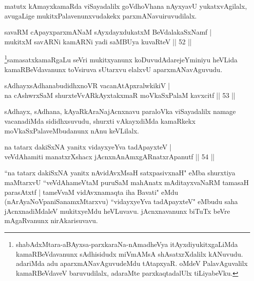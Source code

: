 \begin{artha}
matutx kAmayxkamaRda viSayadalilx goVdhoVhana nAyxyavU yukatxvAgilalx, avugaLige mukitxPalavenunxvudakekx parxmANavu\break iruvudilalx.
\end{artha}


\begin{shl}
savaRM cApayxparxmANaM sAyxdayxdukatxM BeVdalakaSxNamf |\\
mukitxM savARNi kamARNi yadi saMBUya kuvaRteV \hfill || 52 ||
\end{shl}

\begin{artha}
\footnote{shabAdxMtara-aBAyxsa-parxkaraNa-nAmadheVya itAyxdiyukitxgaLiMda kamaRBeVdavanunx sAdhisidudx miVmAMsA shAsatxrXdalilx kANuvudu. adariMda adu aparxmANavAguvudeMdu tAtapxyaR. oMdeV PalavAguvalilx kamaRBeVdaveV baruvudilalx, adaraMte parxkaqtadalUlx tiLiyabeVku.}samasatxkamaRgaLu seVri mukitxyanunx koDuvudAdare\break jeYminiyu heVLida kamaRBeVdavanunx toVsiruva sUtarxvu elalxvU aparxmANavAguvudu.
\end{artha}


\begin{shl}
sAdhayxsAdhanabudidhxnoVR vacanAtApxralwkikiV |\\
na cAshwrxSaM shurxteVvARkAyxtakxmaR moVkaSxPalaM kavxcitf \hfill || 53 ||
\end{shl}

\begin{artha}
sAdhayx, sAdhana, kAyaRkAraNajAcnxnavu paraloVka viSayadalilx namage vacanadiMda sididhxsuvudu, shurxti vAkayxdiMda kamaRkekx moVkaSxPalaveMbudanunx nAnu keVLilalx.
\end{artha}


\begin{shl}
na tatarx dakiSxNA yanitx vidayxyeYva tadApayxteV |\\
veVdAhamiti manatxrXshacx jAcnxnAnAmxgARnatxrApanutf \hfill || 54 ||
\end{shl}


\begin{artha}
``na tatarx dakiSxNA yanitx nAvidAvxMsaH satxpasivxnaH" eMba shurxtiya maMtarxvU ``veVdAhameVtaM puruSaM mahAnatx mAditayxvaNaRM tamasaH parasAtxtf | tameVvaM vidAvxnamaqta iha Bavati" eMdu (nArAyaNoVpaniSanamxMtarxvu) ``vidayxyeYva tadApayxteV" eMbudu saha jAcnxnadiMdaleV mukitxyeMdu heVLuvavu. jAcnxnavanunx biTuTx beVre mAgaRvanunx nirAkarisuvavu.
\end{artha}

